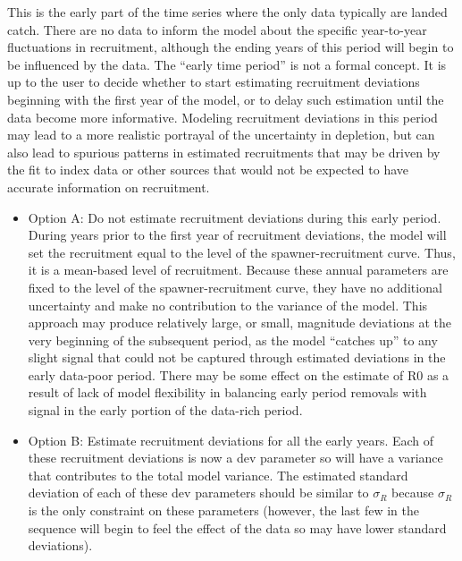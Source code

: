 This is the early part of the time series where the only data typically are landed catch.  There are no data to inform the model about the specific year-to-year fluctuations in recruitment, although the ending years of this period will begin to be influenced by the data.  The “early time period” is not a formal concept. 	It is up to the user to decide whether to start estimating recruitment deviations beginning with the first year of the model, or to delay such estimation until the data become more informative. Modeling recruitment deviations in this period may lead to a more realistic portrayal of the uncertainty in depletion, but can also lead to spurious patterns in estimated recruitments that may be driven by the fit to index data or other sources that would not be expected to have accurate information on recruitment.
	\begin{itemize}
		\item Option A: Do not estimate recruitment deviations during this early period.  During years prior to the first year of recruitment deviations, the model will set the recruitment equal to the level of the spawner-recruitment curve.  Thus, it is a mean-based level of recruitment.  Because these annual parameters are fixed to the level of the spawner-recruitment curve, they have no additional uncertainty and make no contribution to the variance of the model. This approach may produce relatively large, or small, magnitude deviations at the very beginning of the subsequent period, as the model “catches up” to any slight signal that could not be captured through estimated deviations in the early data-poor period.  There may be some effect on the estimate of R0 as a result of lack of model flexibility in balancing early period removals with signal in the early portion of the data-rich period.  
		\item Option B: Estimate recruitment deviations for all the early years.  Each of these recruitment deviations is now a dev parameter so will have a variance that contributes to the total model variance.  The estimated standard deviation of each of these dev parameters should be similar to $\sigma_R$ because $\sigma_R$ is the only constraint on these parameters (however, the last few in the sequence will begin to feel the effect of the data so may have lower standard deviations). 		
	\end{itemize}
	
